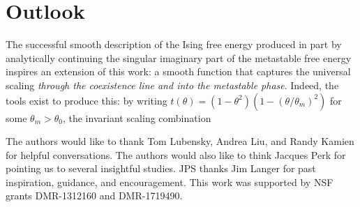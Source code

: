 \documentclass[
aps,
pre,
preprint,
longbibliography,
floatfix
]{revtex4-2}
\begin{document}
\begin{figure}
  \caption{
  }
\end{figure}

\section{Outlook}

The successful smooth description of the Ising free energy produced in part by analytically continuing the singular imaginary part of the metastable free energy inspires an extension of this work: a smooth function that captures the universal scaling \emph{through the coexistence line and into the metastable phase}. Indeed, the tools exist to produce this: by writing $t(\theta)=(1-\theta^2)(1-(\theta/\theta_m)^2)$ for some $\theta_m>\theta_0$, the invariant scaling combination

\begin{acknowledgments}
  The authors would like to thank Tom Lubensky, Andrea Liu, and Randy Kamien
  for helpful conversations. The authors would also like to think Jacques Perk
  for pointing us to several insightful studies. JPS thanks Jim Langer for past
  inspiration, guidance, and encouragement. This work was supported by NSF
  grants DMR-1312160 and DMR-1719490.
\end{acknowledgments}


\end{document}
